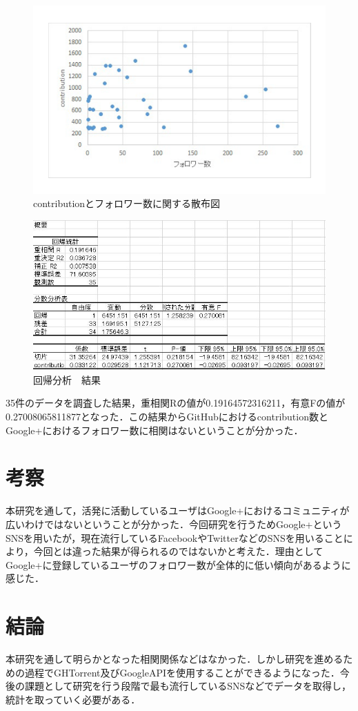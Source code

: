 \begin{figure}[htb]
\centering
\includegraphics[width=12cm]{figure.pdf}
\caption{contributionとフォロワー数に関する散布図}\label{サンプル図}
\end{figure}

\begin{figure}[htb]
\centering
\includegraphics[width=12cm]{kaiki.JPG}
\caption{回帰分析　結果}\label{サンプル図}
\end{figure}

35件のデータを調査した結果，重相関Rの値が0.19164572316211，有意Fの値が0.27008065811877となった．この結果からGitHubにおけるcontribution数とGoogle+におけるフォロワー数に相関はないということが分かった．



\chapter{考察}

本研究を通して，活発に活動しているユーザはGoogle+におけるコミュニティが広いわけではないということが分かった．今回研究を行うためGoogle+というSNSを用いたが，現在流行しているFacebookやTwitterなどのSNSを用いることにより，今回とは違った結果が得られるのではないかと考えた．理由としてGoogle+に登録しているユーザのフォロワー数が全体的に低い傾向があるように感じた．

\chapter{結論}

本研究を通して明らかとなった相関関係などはなかった．しかし研究を進めるための過程でGHTorrent及びGoogleAPIを使用することができるようになった．今後の課題として研究を行う段階で最も流行しているSNSなどでデータを取得し，統計を取っていく必要がある．









